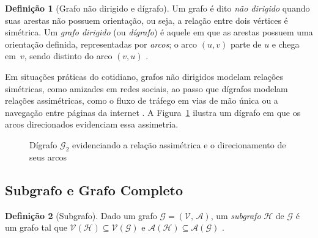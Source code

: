 \documentclass[
  12pt,
  oneside,
  a4paper,
  english,
  brazilian
  ]{abntex2}
\theoremstyle{definition}
\newtheorem{definicao}{Definição}[chapter]
\begin{document}
\begin{definicao}[Grafo não dirigido e dígrafo]
\label{def:dirigido}
  Um grafo é dito \textit{não dirigido} quando suas arestas não possuem
  orientação, ou seja, a relação entre dois vértices é simétrica. Um
  \textit{grafo dirigido} (ou \textit{dígrafo}) é aquele em que as arestas
  possuem uma orientação definida, representadas por \textit{arcos}; o arco
  $(u, v)$ parte de $u$ e chega em~$v$, sendo distinto do arco $(v, u)$
  \cite{cormen2009}.
\end{definicao}

Em situações práticas do cotidiano, grafos não dirigidos modelam relações
simétricas, como amizades em redes sociais, ao passo que dígrafos modelam
relações assimétricas, como o fluxo de tráfego em vias de mão única ou a
navegação entre páginas da internet \cite{rosen2012}. A Figura~\ref{fig:digrafo}
ilustra um dígrafo em que os arcos direcionados evidenciam essa assimetria.

\begin{figure}[htbp]
    \centering
    \caption{Dígrafo $\mathcal{G}_2$ evidenciando a relação assimétrica e o direcionamento de seus arcos}
    \label{fig:digrafo}
\end{figure}

\subsection{Subgrafo e Grafo Completo}

\begin{definicao}[Subgrafo]
  Dado um grafo $\mathcal{G} = (\mathcal{V},\, \mathcal{A})$, um
  \textit{subgrafo} $\mathcal{H}$ de $\mathcal{G}$ é um grafo tal que
  $\mathcal{V}(\mathcal{H}) \subseteq \mathcal{V}(\mathcal{G})$ e
  $\mathcal{A}(\mathcal{H}) \subseteq \mathcal{A}(\mathcal{G})$
  \cite{wilson1996}. 
\end{definicao}
\end{document}
